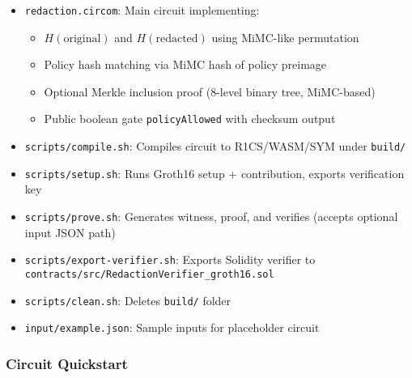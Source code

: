\begin{itemize}
    \item \texttt{redaction.circom}: Main circuit implementing:
    \begin{itemize}
        \item $H(\text{original})$ and $H(\text{redacted})$ using MiMC-like permutation
        \item Policy hash matching via MiMC hash of policy preimage
        \item Optional Merkle inclusion proof (8-level binary tree, MiMC-based)
        \item Public boolean gate \texttt{policyAllowed} with checksum output
    \end{itemize}
    \item \texttt{scripts/compile.sh}: Compiles circuit to R1CS/WASM/SYM under \texttt{build/}
    \item \texttt{scripts/setup.sh}: Runs Groth16 setup + contribution, exports verification key
    \item \texttt{scripts/prove.sh}: Generates witness, proof, and verifies (accepts optional input JSON path)
    \item \texttt{scripts/export-verifier.sh}: Exports Solidity verifier to \texttt{contracts/src/RedactionVerifier\_groth16.sol}
    \item \texttt{scripts/clean.sh}: Deletes \texttt{build/} folder
    \item \texttt{input/example.json}: Sample inputs for placeholder circuit
\end{itemize}

\subsubsection{Circuit Quickstart}

